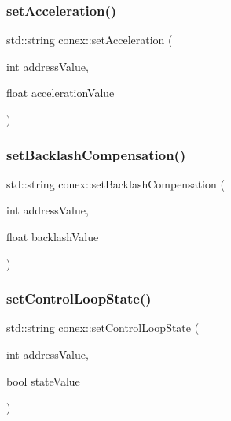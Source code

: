 \mbox{\label{namespaceconex_ae90d099ece6fb06e8eeb4ab3ad5df2bb}} 
\subsubsection{\texorpdfstring{set\+Acceleration()}{setAcceleration()}}
{\footnotesize\ttfamily std\+::string conex\+::set\+Acceleration (\begin{DoxyParamCaption}\item[{int}]{address\+Value,  }\item[{float}]{acceleration\+Value }\end{DoxyParamCaption})}

\mbox{\label{namespaceconex_a8668932baaa1ff47f4bf37d6dabb1c42}} 
\subsubsection{\texorpdfstring{set\+Backlash\+Compensation()}{setBacklashCompensation()}}
{\footnotesize\ttfamily std\+::string conex\+::set\+Backlash\+Compensation (\begin{DoxyParamCaption}\item[{int}]{address\+Value,  }\item[{float}]{backlash\+Value }\end{DoxyParamCaption})}

\mbox{\label{namespaceconex_a617d632120418b5c8f501221c4b3c4e7}} 
\subsubsection{\texorpdfstring{set\+Control\+Loop\+State()}{setControlLoopState()}}
{\footnotesize\ttfamily std\+::string conex\+::set\+Control\+Loop\+State (\begin{DoxyParamCaption}\item[{int}]{address\+Value,  }\item[{bool}]{state\+Value }\end{DoxyParamCaption})}


